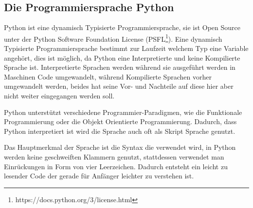 \subsection{Die Programmiersprache Python}\label{einleitung:python}

Python ist eine dynamisch Typisierte Programmiersprache, sie ist Open Source unter der
Python Software Foundation License (PSFL\footnote{https://docs.python.org/3/license.html}).
Eine dynamisch Typisierte Programmiersprache bestimmt zur Laufzeit welchem Typ eine Variable
angehört, dies ist möglich, da Python eine Interpretierte und keine Kompilierte Sprache ist.
Interpretierte Sprachen werden während sie ausgeführt werden in Maschinen Code umgewandelt,
während Kompilierte Sprachen vorher umgewandelt werden, beides hat seine Vor- und Nachteile
auf diese hier aber nicht weiter eingegangen werden soll.

Python unterstützt verschiedene Programmier-Paradigmen, wie die Funktionale Programmierung oder
die Objekt Orientierte Programmierung. Dadurch, dass Python interpretiert ist wird die Sprache
auch oft als Skript Sprache genutzt.

Das Hauptmerkmal der Sprache ist die Syntax die verwendet wird, in Python werden keine geschweiften
Klammern genutzt, stattdessen verwendet man Einrückungen in Form von vier Leerzeichen. Dadurch entsteht
ein leicht zu lesender Code der gerade für Anfänger leichter zu verstehen ist.
